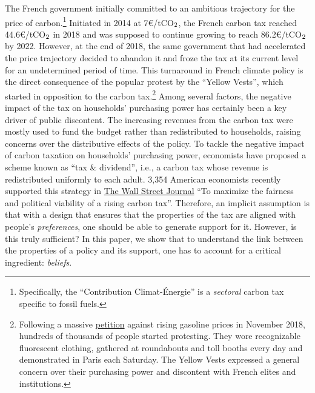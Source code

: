 \documentclass[12pt]{article} %
\begin{document}
The French government initially committed to an ambitious trajectory for the price of carbon.\footnote{Specifically, the ``Contribution Climat-Énergie'' is a \textit{sectoral} carbon tax specific to fossil fuels.} Initiated in 2014 at 7\euro{}/tCO$_\textnormal{2}$, the French carbon tax reached 44.6\euro{}/tCO$_\textnormal{2}$ in 2018 and was supposed to continue growing to reach 86.2\euro{}/tCO$_\textnormal{2}$ by 2022. However, at the end of 2018, the same government that had accelerated the price trajectory decided to abandon it and froze the tax at its current level for an undetermined period of time. This turnaround in French climate policy is the direct consequence of the popular protest by the ``Yellow Vests'', which started in opposition to the carbon tax.\footnote{Following a massive \href{https://www.change.org/p/pour-une-baisse-des-prix-\%C3\%A0-la-pompe-essence-diesel}{petition} against rising gasoline prices in November 2018, hundreds of thousands of people started protesting. They wore recognizable fluorescent clothing, gathered at roundabouts and toll booths every day and demonstrated in Paris each Saturday. The Yellow Vests expressed a general concern over their purchasing power and discontent with French elites and institutions.} %
Among several factors, the negative impact of the tax on households' purchasing power has certainly been a key driver of public discontent. The increasing revenues from the carbon tax were mostly used to fund the budget rather than redistributed to households, raising concerns over the distributive effects of the policy. To tackle the negative impact of carbon taxation on households' purchasing power, economists have proposed a scheme known as ``tax \& dividend'', i.e., a carbon tax whose revenue is redistributed uniformly to each adult. 3,354 American economists recently supported this strategy in \href{https://www.clcouncil.org/media/EconomistsStatement.pdf}{The Wall Street Journal} ``To maximize the fairness and political viability of a rising carbon tax''. Therefore, an implicit assumption is that with a design that ensures that the properties of the tax are aligned with people's \textit{preferences}, one should be able to generate support for it. However, is this truly sufficient? In this paper, we show that to understand the link between the properties of a policy and its support, one has to account for a critical ingredient: \textit{beliefs}.
\end{document}
